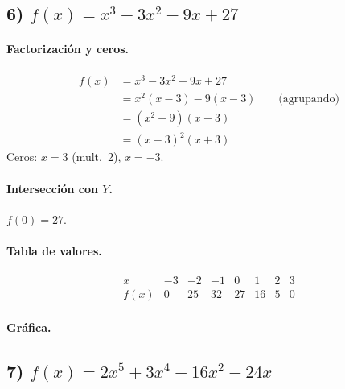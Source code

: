 \documentclass[12pt,a4paper]{article}
\begin{document}
	\bigskip
	
	\subsection*{6) \(f(x)=x^{3}-3x^{2}-9x+27\)}
	\paragraph{Factorización y ceros.}
	\begin{align*}
		f(x) &= x^{3}-3x^{2}-9x+27\\
		&= x^{2}(x-3)-9(x-3) \qquad \text{(agrupando)}\\
		&= (x^{2}-9)(x-3)\\
		&= (x-3)^{2}(x+3)
	\end{align*}
	Ceros: \(x=3\) (mult.\ 2), \(x=-3\).
	
	\paragraph{Intersección con \(Y\).} \(f(0)=27\).
	
	\paragraph{Tabla de valores.}
	\[
	\begin{array}{c|rrrrrrr}
		x & -3 & -2 & -1 & 0 & 1 & 2 & 3\\\hline
		f(x) & 0 & 25 & 32 & 27 & 16 & 5 & 0
	\end{array}
	\]
	
	\paragraph{Gráfica.}
	
	\bigskip
	
	\subsection*{7) \(f(x)=2x^{5}+3x^{4}-16x^{2}-24x\)}
\end{document}
